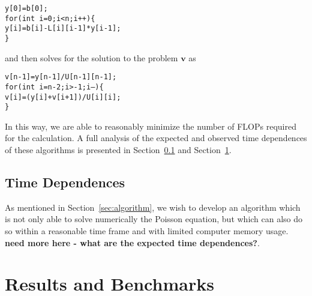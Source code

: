 \documentclass[12pt]{article}
\numberwithin{equation}{section}
\begin{document}
\begin{1stlisting}
\texttt{y[0]=b[0]; \\\indent for(int i=0;i<n;i++)\{ \\\indent\indent y[i]=b[i]-L[i][i-1]*y[i-1]; \\\indent\}}
\end{1stlisting}

\noindent and then solves for the solution to the problem $\textbf{v}$ as

\begin{1stlisting}
\texttt{v[n-1]=y[n-1]/U[n-1][n-1]; \\\indent for(int i=n-2;i>-1;i--)\{ \\\indent\indent v[i]=(y[i]+v[i+1])/U[i][i];\\\indent\}}
\end{1stlisting}

\noindent In this way, we are able to reasonably minimize the number of FLOPs required for the calculation.  A full analysis of the expected and observed time dependences of these algorithms is presented in Section~\ref{subsec:timedependence} and Section~\ref{sec:results}.

\subsection{Time Dependences}
\label{subsec:timedependence}

As mentioned in Section~\ref{sec:algorithm}, we wish to develop an algorithm which is not only able to solve numerically the Poisson equation, but which can also do so within a reasonable time frame and with limited computer memory usage. \textbf{need more here - what are the expected time dependences?}.

\section{Results and Benchmarks}
\label{sec:results}
\end{document}
